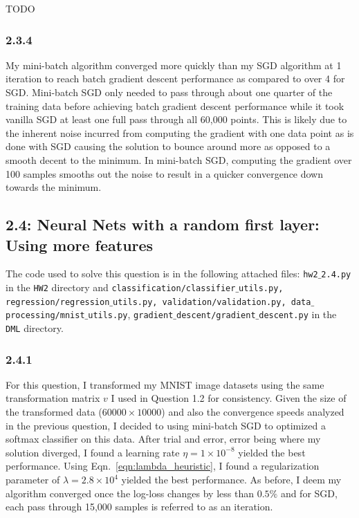 \documentclass[12pt]{amsart}
\begin{document}
TODO

\subsubsection*{2.3.4}

My mini-batch algorithm converged more quickly than my SGD algorithm at 1 iteration to reach batch gradient descent performance as compared to over 4 for SGD.  Mini-batch SGD only needed to pass through about one quarter of the training data before achieving batch gradient descent performance while it took vanilla SGD at least one full pass through all 60,000 points.  This is likely due to the inherent noise incurred from computing the gradient with one data point as is done with SGD causing the solution to bounce around more as opposed to a smooth decent to the minimum.  In mini-batch SGD, computing the gradient over 100 samples smooths out the noise to result in a quicker convergence down towards the minimum.

\subsection*{2.4: Neural Nets with a random first layer: Using more features}

The code used to solve this question is in the following attached files: {\tt hw2$\_$2.4.py} in the {\tt HW2} directory and {\tt classification/classifier$\_$utils.py, regression/regression$\_$utils.py, validation/validation.py, data$\_$processing/mnist$\_$utils.py}, 
{\tt gradient$\_$descent/gradient$\_$descent.py} in the {\tt DML} directory.

\subsubsection*{2.4.1}

For this question, I transformed my MNIST image datasets using the same transformation matrix $v$ I used in Question 1.2 for consistency.  Given the size of the transformed data ($60000 \times 10000$) and also the convergence speeds analyzed in the previous question, I decided to using mini-batch SGD to optimized a softmax classifier on this data.  After trial and error, error being where my solution diverged, I found a learning rate $\eta = 1 \times 10^{-8}$ yielded the best performance.  Using Eqn.~\ref{eqn:lambda_heuristic}, I found a regularization parameter of $\lambda = 2.8 \times 10^{4}$ yielded the best performance.  As before, I deem my algorithm converged once the log-loss changes by less than $0.5\%$ and for SGD, each pass through 15,000 samples is referred to as an iteration.
\end{document}
